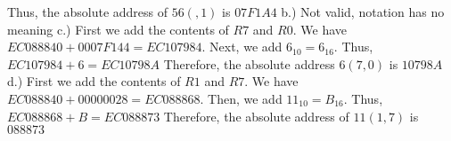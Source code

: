 \documentclass{report}
\begin{document}
    Thus, the absolute address of $56(,1)$ is $07F1A4$
    \bigbreak \noindent 
    b.) Not valid, notation has no meaning
    \bigbreak \noindent 
    c.) First we add the contents of $R7$ and $R0$. We have $EC088840 + 0007F144 = EC107984$. Next, we add $6_{10} = 6_{16}$. Thus, $EC107984 + 6 = EC10798A$
    \bigbreak \noindent 
    Therefore, the absolute address $6(7,0)$ is $10798A$
    \bigbreak \noindent 
    d.) First we add the contents of $R1$ and $R7$. We have $EC088840 + 00000028 = EC088868$. Then, we add $11_{10} = B_{16}$. Thus, $EC088868 + B = EC088873$
    \bigbreak \noindent 
    Therefore, the absolute address of $11(1,7)$ is $088873$















 
\end{document}
